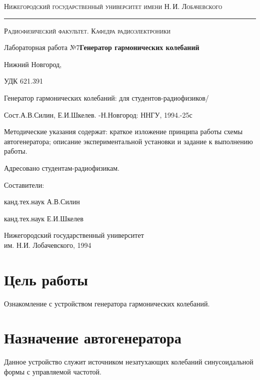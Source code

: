 
\def\labnumber{7}
\def\labtheme{Генератор гармонических колебаний}
\usepackage{rotating}

\begin{titlepage}

\begin{center}

{\small\textsc{Нижегородский государственный университет имени Н.\,И. Лобачевского}}
\vskip 1pt \hrule \vskip 3pt
{\small\textsc{Радиофизический факультет. Кафедра радиоэлектроники}}



\vfill

{\Large Лабораторная работа №\labnumber\vskip 12pt\bfseries \labtheme}
	
\end{center}

\vfill
		

\begin{center}
	Нижний Новгород, \the\year
\end{center}

\end{titlepage}

\newpage
\thispagestyle{empty}
УДК 621.391


Генератор гармонических колебаний: для студентов-радиофизиков/ 
\noindent

Сост.А.В.Силин, Е.И.Шкелев.
-Н.Новгород: ННГУ, 1994.-25с

\vfill
Методические указания содержат: краткое изложение принципа работы схемы автогенератора; описание экспериментальной установки и задание к выполнению работы.

Адресовано студентам-радиофизикам.
\vfill

\begin{center}
	Составители: 

	канд.тех.наук А.В.Силин
	
	канд.тех.наук Е.И.Шкелев
\end{center}
\vfill
\begin{flushleft}
Нижегородский государственный университет \\
им. Н.И. Лобачевского, 1994
\end{flushleft}
\newpage
\section{Цель работы}
Ознакомление с устройством генератора гармонических колебаний.

\section{Назначение автогенератора}
Данное устройство служит источником незатухающих колебаний синусоидальной формы с управляемой частотой.

